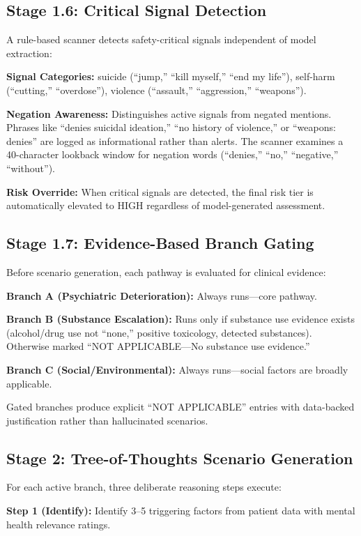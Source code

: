 \documentclass[conference]{IEEEtran}
\begin{document}
\subsection{Stage 1.6: Critical Signal Detection}

A rule-based scanner detects safety-critical signals independent of model extraction:

\textbf{Signal Categories:} suicide (``jump,'' ``kill myself,'' ``end my life''), self-harm (``cutting,'' ``overdose''), violence (``assault,'' ``aggression,'' ``weapons'').

\textbf{Negation Awareness:} Distinguishes active signals from negated mentions. Phrases like ``denies suicidal ideation,'' ``no history of violence,'' or ``weapons: denies'' are logged as informational rather than alerts. The scanner examines a 40-character lookback window for negation words (``denies,'' ``no,'' ``negative,'' ``without'').

\textbf{Risk Override:} When critical signals are detected, the final risk tier is automatically elevated to HIGH regardless of model-generated assessment.

\subsection{Stage 1.7: Evidence-Based Branch Gating}

Before scenario generation, each pathway is evaluated for clinical evidence:

\textbf{Branch A (Psychiatric Deterioration):} Always runs---core pathway.

\textbf{Branch B (Substance Escalation):} Runs only if substance use evidence exists (alcohol/drug use not ``none,'' positive toxicology, detected substances). Otherwise marked ``NOT APPLICABLE---No substance use evidence.''

\textbf{Branch C (Social/Environmental):} Always runs---social factors are broadly applicable.

Gated branches produce explicit ``NOT APPLICABLE'' entries with data-backed justification rather than hallucinated scenarios.

\subsection{Stage 2: Tree-of-Thoughts Scenario Generation}

For each active branch, three deliberate reasoning steps execute:

\textbf{Step 1 (Identify):} Identify 3--5 triggering factors from patient data with mental health relevance ratings.
\end{document}
